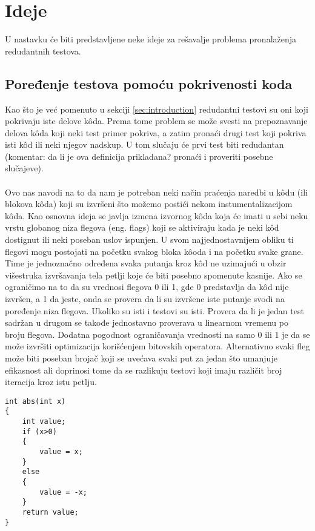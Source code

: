 \documentclass[a4paper]{article}
\begin{document}
\section{Ideje}
\label{sec:ideas}
U nastavku će biti predstavljene neke ideje za rešavalje problema pronalaženja redudantnih testova.

\subsection{Poređenje testova pomoću pokrivenosti koda}
\label{sec:idea1}
Kao što je već pomenuto u sekciji \ref{sec:introduction} redudantni testovi su oni koji pokrivaju iste delove kôda. Prema tome problem se može svesti na prepoznavanje delova kôda koji neki test primer pokriva, a zatim pronaći drugi test koji pokriva isti kôd ili neki njegov nadskup. U tom slučaju će prvi test biti redudantan (komentar: da li je ova definicija prikladana? pronaći i proveriti posebne slučajeve). \\\\
Ovo nas navodi na to da nam je potreban neki način praćenja naredbi u kôdu (ili blokova kôda) koji su izvršeni što možemo postići nekom instumentalizacijom kôda. Kao osnovna ideja se javlja izmena izvornog kôda koja će imati u sebi neku vrstu globanog niza flegova (eng. flags) koji se aktiviraju kada je neki kôd dostignut ili neki poseban uslov ispunjen. U svom najjednostavnijem obliku ti flegovi mogu postojati na početku svakog bloka kôoda i na početku svake grane. Time je jednoznačno određena svaka putanja kroz kôd ne uzimajući u obzir višestruka izvršavanja tela petlji koje će biti posebno spomenute kasnije. Ako se ograničimo na to da su vrednosi flegova 0 ili 1, gde 0 predstavlja da kôd nije izvršen, a 1 da jeste, onda se provera da li su izvršene iste putanje svodi na poređenje niza flegova. Ukoliko su isti i testovi su isti. Provera da li je jedan test sadržan u drugom se takođe jednostavno proverava u linearnom vremenu po broju flegova. Dodatna pogodnost ograničavanja vrednosti na samo 0 ili 1 je da se može izvršiti optimizacija korišćenjem bitovskih operatora. Alternativno svaki fleg može biti poseban brojač koji se uvećava svaki put za jedan što umanjuje efikasnost ali doprinosi tome da se razlikuju testovi koji imaju različit broj iteracija kroz istu petlju.
\begin{lstlisting}
int abs(int x)
{
	int value;
	if (x>0)
	{
		value = x;
	}
	else
	{
		value = -x;
	}
	return value;
}
\end{lstlisting}
\end{document}
